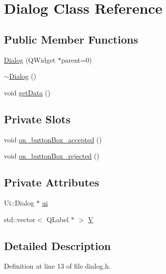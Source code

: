 \hypertarget{class_dialog}{\section{Dialog Class Reference}
\label{class_dialog}
}
\subsection*{Public Member Functions}
\begin{DoxyCompactItemize}
\item 
\hyperlink{class_dialog_acfa2063f9f962d394c6a645b6e7e08d8}{Dialog} (Q\+Widget $\ast$parent=0)
\item 
\hyperlink{class_dialog_a2a1fe6ef28513eed13bfcd3a4da83ccb}{$\sim$\+Dialog} ()
\item 
void \hyperlink{class_dialog_ad1b42c2c6f44d3da7b133fa0f33fe05c}{get\+Data} ()
\end{DoxyCompactItemize}
\subsection*{Private Slots}
\begin{DoxyCompactItemize}
\item 
void \hyperlink{class_dialog_aafe2aef7fbd4d6158b2ac7ed42cbf985}{on\+\_\+button\+Box\+\_\+accepted} ()
\item 
void \hyperlink{class_dialog_a932a060bc56692af1d024203360e839d}{on\+\_\+button\+Box\+\_\+rejected} ()
\end{DoxyCompactItemize}
\subsection*{Private Attributes}
\begin{DoxyCompactItemize}
\item 
Ui\+::\+Dialog $\ast$ \hyperlink{class_dialog_aaa4b5bfb9a0f64900d524f14bc32e6df}{ui}
\item 
std\+::vector$<$ Q\+Label $\ast$ $>$ \hyperlink{class_dialog_a3876121f29753b2702d6070b8262512f}{V}
\end{DoxyCompactItemize}


\subsection{Detailed Description}


Definition at line 13 of file dialog.\+h.



